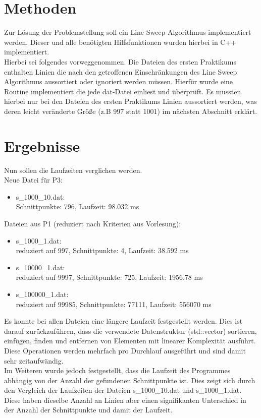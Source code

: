 \documentclass[12pt]{scrartcl}
\begin{document}
\section{Methoden}
Zur Lösung der Problemstellung soll ein Line Sweep Algorithmus implementiert werden. 
Dieser und alle benötigten Hilfsfunktionen wurden hierbei in C++ implementiert.\\
Hierbei sei folgendes vorweggenommen. Die Dateien des ersten Praktikums enthalten Linien die nach den getroffenen Einschränkungen des Line Sweep Algorithmus
aussortiert oder ignoriert werden müssen. Hierfür wurde eine Routine implementiert die jede dat-Datei einliest und überprüft. 
Es mussten hierbei nur bei den Dateien des ersten Praktikums Linien aussortiert werden, was deren leicht veränderte Größe (z.B 997 statt 1001) 
im nächsten Abschnitt erklärt.


\section{Ergebnisse}
Nun sollen die Laufzeiten verglichen werden.\\
Neue Datei für P3: 
\begin{itemize}
    \item s\_1000\_10.dat: \\Schnittpunkte: 796, Laufzeit: 98.032 ms
\end{itemize}

Dateien aus P1 (reduziert nach Kriterien aus Vorlesung):
\begin{itemize}
    \item s\_1000\_1.dat:   \\reduziert auf 997, Schnittpunkte: 4, Laufzeit: 38.592 ms
    \item s\_10000\_1.dat:  \\reduziert auf 9997, Schnittpunkte: 725, Laufzeit: 1956.78 ms
    \item s\_100000\_1.dat: \\reduziert auf 99985, Schnittpunkte: 77111, Laufzeit: 556070 ms
\end{itemize}

Es konnte bei allen Dateien eine längere Laufzeit festgestellt werden. Dies ist darauf zurückzuführen, dass die verwendete Datenstruktur (std::vector) sortieren, einfügen, finden und entfernen von Elementen mit linearer Komplexität ausführt.
Diese Operationen werden mehrfach pro Durchlauf ausgeführt und sind damit sehr zeitaufwändig.\\
Im Weiteren wurde jedoch festgestellt, dass die Laufzeit des Programmes abhängig von der Anzahl der gefundenen Schnittpunkte ist.
Dies zeigt sich durch den Vergleich der Laufzeiten der Dateien s\_1000\_10.dat und s\_1000\_1.dat. Diese haben dieselbe Anzahl an Linien aber einen signifikanten Unterschied in der Anzahl der Schnittpunkte und damit der Laufzeit.
\end{document}
